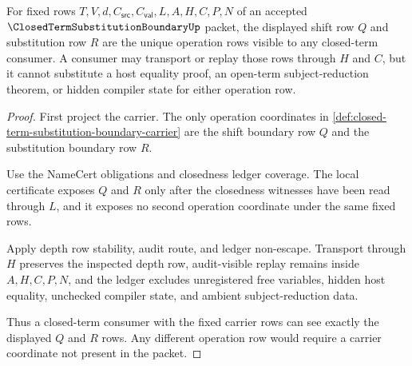 \begin{theorem}
\label{thm:closed-term-substitution-boundary-operation-row-determinacy}
For fixed rows $T,V,d,C_{\mathsf{src}},C_{\mathsf{val}},L,A,H,C,P,N$ of an accepted $\ClosedTermSubstitutionBoundaryUp$ packet, the displayed shift row $Q$ and substitution row $R$ are the unique operation rows visible to any closed-term consumer. A consumer may transport or replay those rows through $H$ and $C$, but it cannot substitute a host equality proof, an open-term subject-reduction theorem, or hidden compiler state for either operation row.
\end{theorem}
\begin{proof}
First project the carrier. The only operation coordinates in \autoref{def:closed-term-substitution-boundary-carrier} are the shift boundary row $Q$ and the substitution boundary row $R$.

Use the NameCert obligations and closedness ledger coverage. The local certificate exposes $Q$ and $R$ only after the closedness witnesses have been read through $L$, and it exposes no second operation coordinate under the same fixed rows.

Apply depth row stability, audit route, and ledger non-escape. Transport through $H$ preserves the inspected depth row, audit-visible replay remains inside $A,H,C,P,N$, and the ledger excludes unregistered free variables, hidden host equality, unchecked compiler state, and ambient subject-reduction data.

Thus a closed-term consumer with the fixed carrier rows can see exactly the displayed $Q$ and $R$ rows. Any different operation row would require a carrier coordinate not present in the packet.
\end{proof}

